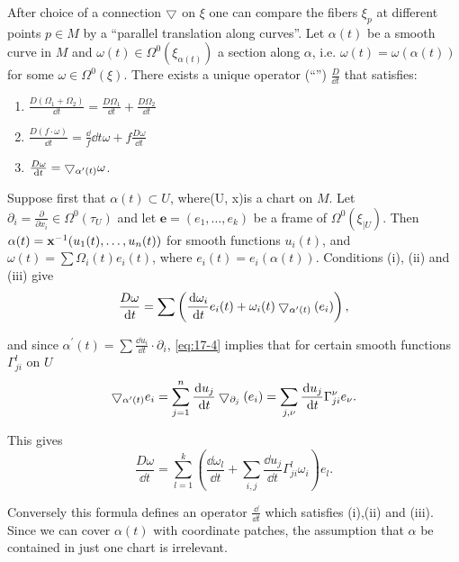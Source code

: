 \begin{remark}\label{remark:17-4}
After choice of a connection $\bigtriangledown$ on $\xi$ one can compare the fibers ${\xi }_{p}$ at different 
points $p \in  M$ by a ``parallel translation along curves''. Let $\alpha (t)$ be a smooth curve in $M$ 
and $\omega (t)  \in  \Omega^0( {\xi }_{\alpha (t) })$ a section along $\alpha$, 
i.e. $\omega (t)  = \omega ( {\alpha (t) })$ for some $\omega  \in  \Omega^0(\xi)$. There exists a unique 
operator (``'') $\frac{D}{\dd t}$ that satisfies:
\begin{enumerate} 
  \item $\frac{D( {\Omega_1 + \Omega_{2}}) }{\dd t} = \frac{D\Omega_1}{\dd t} + \frac{D\Omega_{2}}{\dd t}$
  \item $\frac{D( {f \cdot  \omega }) }{\dd t} = \frac\dd f{\dd t}\omega  + f\frac{D\omega }{\dd t}$
  \item $\frac{D\omega }{\dd t} = \btd_{{\alpha }^{\prime }(t) }\omega$.
\end{enumerate}

Suppose first that $\alpha (t)  \subset  U$, where(U, x)is a chart on $M$. 
Let ${\partial }_{i} = \frac{\partial }{\partial x_{i}} \in  \Omega^0( {\tau }_{U})$ and 
let $\mathbf{e} = ( {{e}_1,\ldots,{e}_{k}})$ be a frame of $\Omega^0( {\xi }_{\mid U})$. 
Then $\alpha (t)  = \mathbf{x}^{-1}( {{u}_1(t),\ldots,{u}_{n}(t) })$ for smooth functions ${u}_{i}(t)$, 
and $\omega (t)  = \sum \Omega_{i}(t) {e}_{i}(t)$, where ${e}_{i}(t)  = {e}_{i}( {\alpha (t) })$. 
Conditions (i), (ii) and (iii) give
\[
  \frac{D\omega }{\dd t} 
    = \sum \left( {\frac{\dd\omega_{i}}{\dd t}{e}_{i}(t)  
      + \omega_{i}(t) \btd_{{\alpha }^{\prime }(t) }( {e}_{i}) }\right),
\]

and since ${\alpha }^{\prime }(t)  = \sum \frac{\dd{u}_{i}}{\dd t} \cdot  {\partial }_{i}$, \eqref{eq:17-4} implies 
that for certain smooth functions ${\Gamma}_{ji}^{l}$ on $U$
\[
  \btd_{{\alpha }^{\prime }(t) }{e}_{i} 
  = \sum_{{j = 1}}^{n}\frac{\dd{u}_{j}}{\dd t}\btd_{{\partial }_{j}}( {e}_{i})  
  = \sum_{{j,\nu }}\frac{\dd{u}_{j}}{\dd t}{\Gamma }_{ji}^{\nu }{e}_{\nu }.
\]

This gives
\[
  \frac{D\omega }{\dd t} 
  = \sum_{{l = 1}}^{k}\left( {\frac{\dd \omega_{l}}{\dd t} + \sum_{{i,j}}\frac{\dd {u}_{j}}{\dd t}{\Gamma }_{ji}^{l}\omega_{i}}\right) {e}_{l}.
\]

Conversely this formula defines an operator $\frac\dd{\dd t}$ which satisfies (i),(ii) and (iii). Since we can 
cover $\alpha (t)$ with coordinate patches, the assumption that $\alpha$ be contained in just one chart 
is irrelevant. 
\end{remark}

